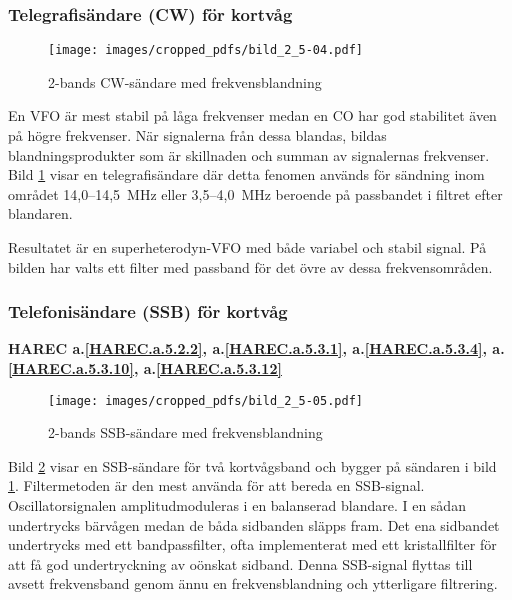 \subsubsection{Telegrafisändare (CW) för kortvåg}

\begin{figure}
  \texttt{[image: images/cropped\_pdfs/bild\_2\_5-04.pdf]}
  \caption{2-bands CW-sändare med frekvensblandning}
  \label{fig:bildII5-4}
\end{figure}

En VFO är mest stabil på låga frekvenser medan en CO har god
stabilitet även på högre frekvenser.
När signalerna från dessa blandas, bildas blandningsprodukter som är
skillnaden och summan av signalernas frekvenser.
Bild \ref{fig:bildII5-4} visar en telegrafisändare där detta fenomen används
för sändning inom området 14,0--14,5~MHz eller 3,5--4,0~MHz beroende
på passbandet i filtret efter blandaren.

Resultatet är en superheterodyn-VFO med både variabel och stabil
signal.
På bilden har valts ett filter med passband för det övre av dessa
frekvensområden.

\subsubsection{Telefonisändare (SSB) för kortvåg}
\textbf{HAREC
 a.\ref{HAREC.a.5.2.2}\label{myHAREC.a.5.2.2},
 a.\ref{HAREC.a.5.3.1}\label{myHAREC.a.5.3.1},
 a.\ref{HAREC.a.5.3.4}\label{myHAREC.a.5.3.4},
 a.\ref{HAREC.a.5.3.10}\label{myHAREC.a.5.3.10},
 a.\ref{HAREC.a.5.3.12}\label{myHAREC.a.5.3.12}
}

\begin{figure}
  \texttt{[image: images/cropped\_pdfs/bild\_2\_5-05.pdf]}
  \caption{2-bands SSB-sändare med frekvensblandning}
  \label{fig:bildII5-5}
\end{figure}

Bild \ref{fig:bildII5-5} visar en SSB-sändare för två kortvågsband och
bygger på sändaren i bild \ref{fig:bildII5-4}.
Filtermetoden är den mest använda för att bereda en SSB-signal.
Oscillatorsignalen amplitudmoduleras i en balanserad blandare.
I en sådan undertrycks bärvågen medan de båda sidbanden släpps fram.
Det ena sidbandet undertrycks med ett bandpassfilter, ofta implementerat med
ett kristallfilter för att få god undertryckning av oönskat sidband.
Denna SSB-signal flyttas till avsett frekvensband
genom ännu en frekvensblandning och ytterligare filtrering.

